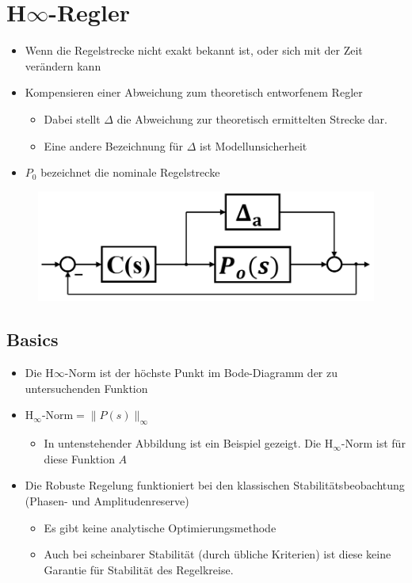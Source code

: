 \section{H$\infty$-Regler}
\begin{itemize}
	\item Wenn die Regelstrecke nicht exakt bekannt ist, oder sich mit der Zeit verändern kann
	\item Kompensieren einer Abweichung zum theoretisch entworfenem Regler
	\begin{itemize}
		\item Dabei stellt $\Delta$ die Abweichung zur theoretisch ermittelten Strecke dar. 
		\item Eine andere Bezeichnung für $\Delta$ ist Modellunsicherheit
	\end{itemize}
	\item $P_0$ bezeichnet die nominale Regelstrecke
\end{itemize}
\begin{figure}[h!]
	\centering
	\includegraphics[width=0.25\linewidth]{bilder/HInf1}
	\label{fig:hinf1}
\end{figure}

\subsection{Basics}
\begin{itemize}
	\item Die H$\infty$-Norm ist der höchste Punkt im Bode-Diagramm der zu untersuchenden Funktion
	\item $\text{H}_\infty\text{-Norm} = \lVert P(s) \rVert_\infty$
	\begin{itemize}
		\item In untenstehender Abbildung ist ein Beispiel gezeigt. Die $\text{H}_\infty\text{-Norm}$ ist für diese Funktion $A$
	\end{itemize}
	\item Die Robuste Regelung funktioniert bei den klassischen Stabilitätsbeobachtung (Phasen- und Amplitudenreserve)
	\begin{itemize}
		\item Es gibt keine analytische Optimierungsmethode
		\item Auch bei scheinbarer Stabilität (durch übliche Kriterien) ist diese keine Garantie für Stabilität des Regelkreise. 
	\end{itemize}
\end{itemize}

